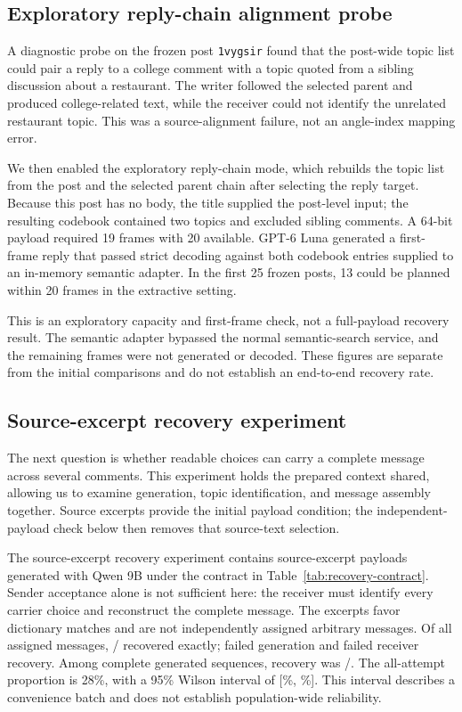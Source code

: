 \subsection{Exploratory reply-chain alignment probe}
\label{sec:reply-chain-probe}

A diagnostic probe on the frozen post \texttt{1vygsir} found that the post-wide topic list could pair a reply to a college comment with a topic quoted from a sibling discussion about a restaurant.
The writer followed the selected parent and produced college-related text, while the receiver could not identify the unrelated restaurant topic.
This was a source-alignment failure, not an angle-index mapping error.

We then enabled the exploratory reply-chain mode, which rebuilds the topic list from the post and the selected parent chain after selecting the reply target.
Because this post has no body, the title supplied the post-level input; the resulting codebook contained two topics and excluded sibling comments.
A 64-bit payload required 19 frames with 20 available.
GPT-6 Luna generated a first-frame reply that passed strict decoding against both codebook entries supplied to an in-memory semantic adapter.
In the first 25 frozen posts, 13 could be planned within 20 frames in the extractive setting.

This is an exploratory capacity and first-frame check, not a full-payload recovery result.
The semantic adapter bypassed the normal semantic-search service, and the remaining frames were not generated or decoded.
These figures are separate from the initial comparisons and do not establish an end-to-end recovery rate.

\FloatBarrier
\subsection{Source-excerpt recovery experiment}
\label{sec:october-recovery}
The next question is whether readable choices can carry a complete message across several comments. This experiment holds the prepared context shared, allowing us to examine generation, topic identification, and message assembly together. Source excerpts provide the initial payload condition; the independent-payload check below then removes that source-text selection.

The source-excerpt recovery experiment contains \OctAttempts{} source-excerpt payloads generated with Qwen 9B under the contract in Table~\ref{tab:recovery-contract}. Sender acceptance alone is not sufficient here: the receiver must identify every carrier choice and reconstruct the complete message. The excerpts favor dictionary matches and are not independently assigned arbitrary messages. Of all assigned messages, \OctExact/\OctAttempts{} recovered exactly; \OctGenerationFailures{} failed generation and \OctReceiverFailures{} failed receiver recovery. Among complete generated sequences, recovery was \OctExact/\OctComplete{}. The all-attempt proportion is 28\%, with a 95\% Wilson interval of [\OctWilsonLow\%, \OctWilsonHigh\%]. This interval describes a convenience batch and does not establish population-wide reliability.

